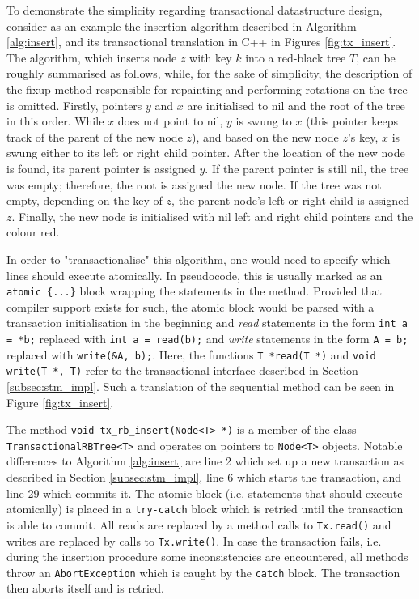 To demonstrate the simplicity regarding transactional datastructure design, consider as an example the insertion algorithm described in Algorithm \ref{alg:insert}, and its transactional translation in C++ in Figures  \ref{fig:tx_insert}. The algorithm, which inserts node $z$ with key $k$ into a red-black tree $T$, can be roughly summarised as follows, while, for the sake of simplicity, the description of the fixup method responsible for repainting and performing rotations on the tree is omitted. Firstly, pointers $y$ and $x$ are initialised to nil and the root of the tree in this order. While $x$ does not point to nil, $y$ is swung to $x$ (this pointer keeps track of the parent of the new node $z$), and based on the new node $z$'s key, $x$ is swung either to its left or right child pointer. After the location of the new node is found, its parent pointer is assigned $y$. If the parent pointer is still nil, the tree was empty; therefore, the root is assigned the new node. If the tree was not empty, depending on the key of $z$, the parent node's left or right child is assigned $z$. Finally, the new node is initialised with nil left and right child pointers and the colour red.

In order to "transactionalise" this algorithm, one would need to specify which lines should execute atomically. In pseudocode, this is usually marked as an \texttt{atomic \{...\}} block wrapping the statements in the method. Provided
that compiler support exists for such, the atomic block would be parsed with a transaction initialisation in the beginning and \textit{read} statements in the form \texttt{int a = *b;} replaced with \texttt{int a = read(b);} and \textit{write} statements in the form \texttt{A = b;} replaced with \texttt{write(\&A, b);}. Here, the functions \texttt{T *read(T *)} and \texttt{void write(T *, T)} refer to the transactional interface described in Section \ref{subsec:stm_impl}. Such a translation of the sequential method can be seen in Figure \ref{fig:tx_insert}.

The method \texttt{void tx\_rb\_insert(Node<T> *)} is a member of the class\\ \texttt{TransactionalRBTree<T>} and operates on pointers to \texttt{Node<T>} objects. Notable differences to Algorithm \ref{alg:insert} are line 2 which set up a new transaction as described in Section \ref{subsec:stm_impl}, line 6 which starts the transaction, and line 29 which commits it. The atomic block (i.e. statements that should execute atomically) is placed in a \texttt{try-catch} block which is retried until the transaction is able to commit. All reads are replaced by a method calls to \texttt{Tx.read()} and writes are replaced by calls to \texttt{Tx.write()}. In case the transaction fails, i.e. during the insertion procedure some inconsistencies are encountered, all methods throw an \texttt{AbortException} which is caught by the \texttt{catch} block. The transaction then aborts itself and is retried.

